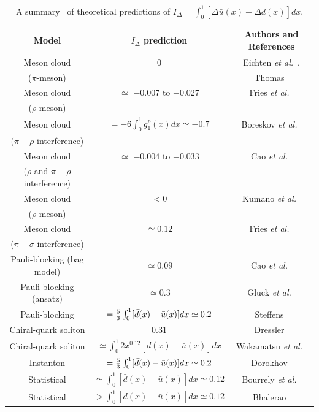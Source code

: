 \begin{table}[htbp]
\begin{center}
\begin{tabular}{ccc}
\hline
     Model                    & $I_\Delta$ prediction & Authors and References \\ \hline
    Meson cloud  &  0                    & Eichten {\it et al.}~\protect\cite{eichten},\\ 
    ($\pi$-meson) &                     &  Thomas~\protect\cite{thomas}\\ 
    Meson cloud  &  $\simeq$ $-0.007$ to $-0.027$ & Fries {\it et al.}~\protect\cite{fries} \\ 
    ($\rho$-meson) &   & \\ 
    Meson cloud  & $ =-6 \int_0^1 g_1^p(x)dx \simeq -0.7 $ & Boreskov {\it et al.}~\protect\cite{Boreskov} \\ 
    ($\pi-\rho$ interference) &                         &  \\ 
    Meson cloud & $\simeq$ $-0.004$ to $-0.033$ & Cao {\it et al.}~\protect\cite{cao} \\ 
    ($\rho$ and $\pi-\rho$ interference) &  &  \\ 
    Meson cloud  &  $< 0$                                          & Kumano {\it et al.}~\protect\cite{Kumano} \\ 
    ($\rho$-meson) &                                            & \\ 
    Meson cloud & $\simeq 0.12$ & Fries {\it et al.}~\protect\cite{fries2} \\ 
    ($\pi-\sigma$ interference) & &  \\ 
    Pauli-blocking (bag model)  & $\simeq 0.09$ & Cao {\it et al.}~\protect\cite{cao} \\ 
    Pauli-blocking (ansatz) & $\simeq 0.3$ & Gluck {\it et al.}~\protect\cite{gluck} \\ 
    Pauli-blocking & $={5 \over 3} \int_0^1 [\bar{d}(x)-\bar{u}(x)]dx \simeq 0.2$ & Steffens~\protect\cite{steffens} \\ 
    Chiral-quark soliton & $0.31$ & Dressler~\protect\cite{dressler} \\ 
    Chiral-quark soliton & $\simeq \int_0^1 2 x^0.12[\bar{d}(x)-\bar{u}(x)]dx$ & Wakamatsu {\it et al.}~\protect\cite{wakamatsu} \\ 
    Instanton & $={5 \over 3} \int_0^1 [\bar{d}(x)-\bar{u}(x)]dx \simeq 0.2$ & Dorokhov~\protect\cite{dorokhov} \\ 
    Statistical & $\simeq  \int_0^1 [\bar{d}(x)-\bar{u}(x)]dx \simeq 0.12$ & Bourrely {\it et al.}~\protect\cite{Bourrely200739} \\ 
    Statistical & $ >  \int_0^1 [\bar{d}(x)-\bar{u}(x)]dx \simeq 0.12$ & Bhalerao~\protect\cite{bhalerao} \\ 
\hline
 \end{tabular}
\end{center}
\caption{\label{tab:polubdb}
A summary~\protect\cite{Peng:2003zm} of theoretical
predictions of $I_\Delta = \int_0^1 [\Delta \bar{u}(x)-\Delta \bar{d}(x)]dx$.}
\end{table}



